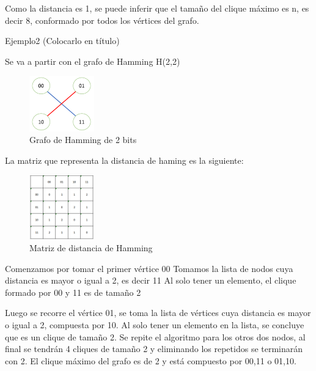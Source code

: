 \documentclass[conference,compsoc]{IEEEtran}
\begin{document}
{Como la distancia es 1, se puede inferir que el tamaño del clique máximo es n, es decir 8, conformado por todos los vértices del grafo.

Ejemplo2 (Colocarlo en título)

Se va a partir con el grafo de Hamming H(2,2)

\begin{figure}[h] 
    \centering
    \includegraphics[width=0.25\textwidth]{Problema3/t2.png}
    \caption{Grafo de Hamming de 2 bits}
    \label{fig:mesh1}
\end{figure}

La matriz que representa la distancia de haming es la siguiente:

\begin{figure}[h] 
    \centering
    \includegraphics[width=0.25\textwidth]{Problema3/t3.png}
    \caption{Matriz de distancia de Hamming}
    \label{fig:mesh1}
\end{figure}
$$$$$$$$
Comenzamos por tomar el primer vértice 00
Tomamos la lista de nodos cuya distancia es mayor o igual a 2, es decir 11
Al solo tener un elemento, el clique formado por 00 y 11 es de tamaño 2

Luego se recorre el vértice 01, se toma la lista de vértices cuya distancia es mayor o igual a 2, compuesta por 10. Al solo tener un elemento en la lista, se concluye que es un clique de tamaño 2.
Se repite el algoritmo para los otros dos nodos, al final se tendrán 4 cliques de tamaño 2 y eliminando los repetidos se terminarán con 2.
El clique máximo del grafo es de 2 y está compuesto por {00,11} o {01,10}.


\begin{thebibliography}{1}


\end{thebibliography}}
\end{document}
